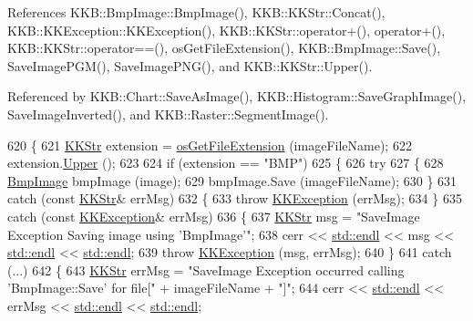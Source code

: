 References K\+K\+B\+::\+Bmp\+Image\+::\+Bmp\+Image(), K\+K\+B\+::\+K\+K\+Str\+::\+Concat(), K\+K\+B\+::\+K\+K\+Exception\+::\+K\+K\+Exception(), K\+K\+B\+::\+K\+K\+Str\+::operator+(), operator+(), K\+K\+B\+::\+K\+K\+Str\+::operator==(), os\+Get\+File\+Extension(), K\+K\+B\+::\+Bmp\+Image\+::\+Save(), Save\+Image\+P\+G\+M(), Save\+Image\+P\+N\+G(), and K\+K\+B\+::\+K\+K\+Str\+::\+Upper().



Referenced by K\+K\+B\+::\+Chart\+::\+Save\+As\+Image(), K\+K\+B\+::\+Histogram\+::\+Save\+Graph\+Image(), Save\+Image\+Inverted(), and K\+K\+B\+::\+Raster\+::\+Segment\+Image().


\begin{DoxyCode}
620 \{
621   \hyperlink{class_k_k_b_1_1_k_k_str}{KKStr}  extension = \hyperlink{namespace_k_k_b_ac66b0fee156008ea19ba4a0068378743}{osGetFileExtension} (imageFileName);
622   extension.\hyperlink{class_k_k_b_1_1_k_k_str_a66ea0feabc94da88591b56a683695bd9}{Upper} ();
623 
624   \textcolor{keywordflow}{if}  (extension == \textcolor{stringliteral}{"BMP"})
625   \{
626     \textcolor{keywordflow}{try}
627     \{
628       \hyperlink{class_k_k_b_1_1_bmp_image}{BmpImage}  bmpImage (image);
629       bmpImage.Save (imageFileName);
630     \}
631     \textcolor{keywordflow}{catch}  (\textcolor{keyword}{const} \hyperlink{class_k_k_b_1_1_k_k_str}{KKStr}&  errMsg)
632     \{
633       \textcolor{keywordflow}{throw} \hyperlink{class_k_k_b_1_1_k_k_exception}{KKException} (errMsg);
634     \}
635     \textcolor{keywordflow}{catch}  (\textcolor{keyword}{const} \hyperlink{class_k_k_b_1_1_k_k_exception}{KKException}&  errMsg)
636     \{
637       \hyperlink{class_k_k_b_1_1_k_k_str}{KKStr} msg = \textcolor{stringliteral}{"SaveImage  Exception  Saving image using 'BmpImage'"};
638       cerr << \hyperlink{namespace_k_k_b_ad1f50f65af6adc8fa9e6f62d007818a8}{std::endl} << msg << \hyperlink{namespace_k_k_b_ad1f50f65af6adc8fa9e6f62d007818a8}{std::endl} << \hyperlink{namespace_k_k_b_ad1f50f65af6adc8fa9e6f62d007818a8}{std::endl};
639       \textcolor{keywordflow}{throw} \hyperlink{class_k_k_b_1_1_k_k_exception}{KKException} (msg, errMsg);
640     \}
641     \textcolor{keywordflow}{catch} (...)
642     \{
643       \hyperlink{class_k_k_b_1_1_k_k_str}{KKStr}  errMsg = \textcolor{stringliteral}{"SaveImage   Exception occurred calling 'BmpImage::Save'  for file["} + 
      imageFileName + \textcolor{stringliteral}{"]"};
644       cerr << \hyperlink{namespace_k_k_b_ad1f50f65af6adc8fa9e6f62d007818a8}{std::endl} << errMsg << \hyperlink{namespace_k_k_b_ad1f50f65af6adc8fa9e6f62d007818a8}{std::endl} << \hyperlink{namespace_k_k_b_ad1f50f65af6adc8fa9e6f62d007818a8}{std::endl};

\end{DoxyCode}
